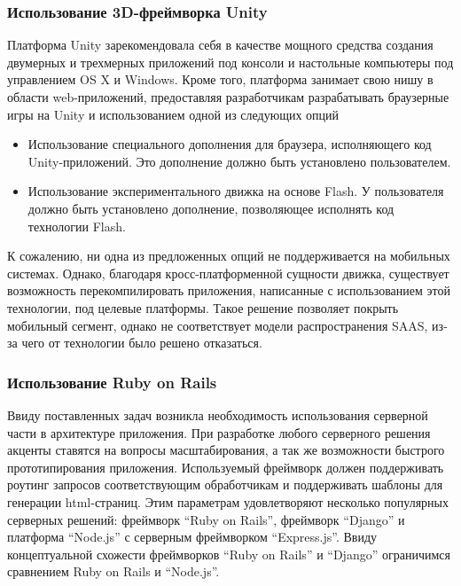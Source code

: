 \documentclass[14pt, a4paper]{extarticle}
\begin{document}
\subsubsection{Использование 3D-фреймворка Unity}

Платформа Unity зарекомендовала себя в качестве мощного средства создания
двумерных и трехмерных приложений под консоли и настольные компьютеры под
управлением OS X и Windows. Кроме того, платформа занимает свою нишу в области
web-приложений, предоставляя разработчикам разрабатывать браузерные игры на
Unity и использованием одной из следующих опций

\begin{itemize}
    \item Использование специального дополнения для браузера, исполняющего код
    Unity-приложений. Это дополнение должно быть установлено пользователем.
    \item Использование экспериментального движка на основе Flash. У
    пользователя должно быть установлено дополнение, позволяющее исполнять код
    технологии Flash.
\end{itemize}

К сожалению, ни одна из предложенных опций не поддерживается на мобильных
системах. Однако, благодаря кросс-платформенной сущности движка, существует
возможность перекомпилировать приложения, написанные с использованием этой
технологии, под целевые платформы. Такое решение позволяет покрыть мобильный
сегмент, однако не соответствует модели распространения SAAS, из-за чего от
технологии было решено отказаться.

\subsubsection{Использование Ruby on Rails}

Ввиду поставленных задач возникла необходимость использования серверной части в
архитектуре приложения. При разработке любого серверного решения
акценты ставятся на вопросы масштабирования, а так же возможности быстрого
прототипирования приложения. Используемый фреймворк должен
поддерживать роутинг запросов соответствующим обработчикам и поддерживать
шаблоны для генерации html-страниц. Этим параметрам удовлетворяют
несколько популярных серверных решений: фреймворк ``Ruby on Rails'', фреймворк
``Django'' и платформа ``Node.js'' с серверным фреймворком
``Express.js''\cite{expressjs}. Ввиду
концептуальной схожести фреймворков ``Ruby on Rails'' и ``Django'' ограничимся сравнением Ruby on Rails и ``Node.js''.
\end{document}
